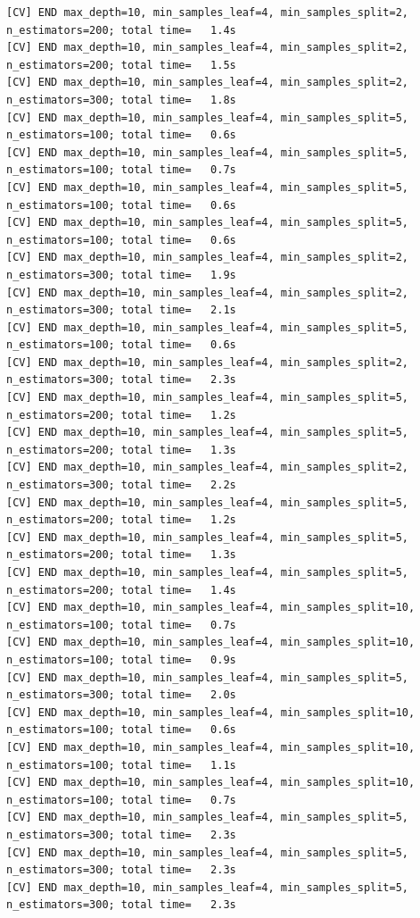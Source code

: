 \documentclass[
  11pt,
  letterpaper,
  DIV=11,
  numbers=noendperiod]{scrartcl}
\begin{document}
\begin{verbatim}
[CV] END max_depth=10, min_samples_leaf=4, min_samples_split=2, n_estimators=200; total time=   1.4s
[CV] END max_depth=10, min_samples_leaf=4, min_samples_split=2, n_estimators=200; total time=   1.5s
[CV] END max_depth=10, min_samples_leaf=4, min_samples_split=2, n_estimators=300; total time=   1.8s
[CV] END max_depth=10, min_samples_leaf=4, min_samples_split=5, n_estimators=100; total time=   0.6s
[CV] END max_depth=10, min_samples_leaf=4, min_samples_split=5, n_estimators=100; total time=   0.7s
[CV] END max_depth=10, min_samples_leaf=4, min_samples_split=5, n_estimators=100; total time=   0.6s
[CV] END max_depth=10, min_samples_leaf=4, min_samples_split=5, n_estimators=100; total time=   0.6s
[CV] END max_depth=10, min_samples_leaf=4, min_samples_split=2, n_estimators=300; total time=   1.9s
[CV] END max_depth=10, min_samples_leaf=4, min_samples_split=2, n_estimators=300; total time=   2.1s
[CV] END max_depth=10, min_samples_leaf=4, min_samples_split=5, n_estimators=100; total time=   0.6s
[CV] END max_depth=10, min_samples_leaf=4, min_samples_split=2, n_estimators=300; total time=   2.3s
[CV] END max_depth=10, min_samples_leaf=4, min_samples_split=5, n_estimators=200; total time=   1.2s
[CV] END max_depth=10, min_samples_leaf=4, min_samples_split=5, n_estimators=200; total time=   1.3s
[CV] END max_depth=10, min_samples_leaf=4, min_samples_split=2, n_estimators=300; total time=   2.2s
[CV] END max_depth=10, min_samples_leaf=4, min_samples_split=5, n_estimators=200; total time=   1.2s
[CV] END max_depth=10, min_samples_leaf=4, min_samples_split=5, n_estimators=200; total time=   1.3s
[CV] END max_depth=10, min_samples_leaf=4, min_samples_split=5, n_estimators=200; total time=   1.4s
[CV] END max_depth=10, min_samples_leaf=4, min_samples_split=10, n_estimators=100; total time=   0.7s
[CV] END max_depth=10, min_samples_leaf=4, min_samples_split=10, n_estimators=100; total time=   0.9s
[CV] END max_depth=10, min_samples_leaf=4, min_samples_split=5, n_estimators=300; total time=   2.0s
[CV] END max_depth=10, min_samples_leaf=4, min_samples_split=10, n_estimators=100; total time=   0.6s
[CV] END max_depth=10, min_samples_leaf=4, min_samples_split=10, n_estimators=100; total time=   1.1s
[CV] END max_depth=10, min_samples_leaf=4, min_samples_split=10, n_estimators=100; total time=   0.7s
[CV] END max_depth=10, min_samples_leaf=4, min_samples_split=5, n_estimators=300; total time=   2.3s
[CV] END max_depth=10, min_samples_leaf=4, min_samples_split=5, n_estimators=300; total time=   2.3s
[CV] END max_depth=10, min_samples_leaf=4, min_samples_split=5, n_estimators=300; total time=   2.3s

\end{verbatim}
\end{document}
